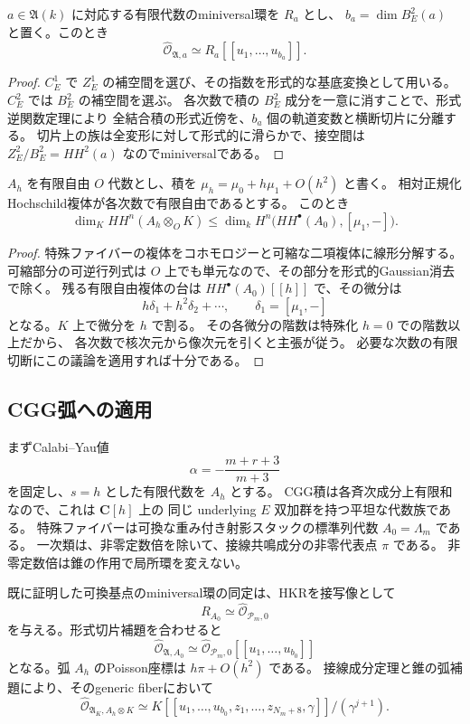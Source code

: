 \begin{lemma}[軌道方向を分離する形式切片]
\label{lem:algebra-slice-v35}
$a\in\mathfrak A(k)$ に対応する有限代数のminiversal環を $R_a$ とし、
$b_a=\dim B_E^2(a)$ と置く。このとき
\[
 \widehat{\mathcal O}_{\mathfrak A,a}
       \simeq R_a[[u_1,\ldots,u_{b_a}]].
\]
\end{lemma}

\begin{proof}
$C_E^1$ で $Z_E^1$ の補空間を選び、その指数を形式的な基底変換として用いる。
$C_E^2$ では $B_E^2$ の補空間を選ぶ。
各次数で積の $B_E^2$ 成分を一意に消すことで、形式逆関数定理により
全結合積の形式近傍を、$b_a$ 個の軌道変数と横断切片に分離する。
切片上の族は全変形に対して形式的に滑らかで、接空間は
$Z_E^2/B_E^2=HH^2(a)$ なのでminiversalである。
\end{proof}

\begin{lemma}[最初の差分による上界]
\label{lem:first-differential-v35}
$A_h$ を有限自由 $O$ 代数とし、積を
$\mu_h=\mu_0+h\mu_1+O(h^2)$ と書く。
相対正規化Hochschild複体が各次数で有限自由であるとする。
このとき
\[
 \dim_K HH^n(A_h\otimes_O K)
 \le
 \dim_k H^n\bigl(HH^\bullet(A_0),[\mu_1,-]\bigr).
\]
\end{lemma}

\begin{proof}
特殊ファイバーの複体をコホモロジーと可縮な二項複体に線形分解する。
可縮部分の可逆行列式は $O$ 上でも単元なので、その部分を形式的Gaussian消去で除く。
残る有限自由複体の台は $HH^\bullet(A_0)[[h]]$ で、その微分は
\[
 h\delta_1+h^2\delta_2+\cdots,\qquad
 \delta_1=[\mu_1,-]
\]
となる。$K$ 上で微分を $h$ で割る。
その各微分の階数は特殊化 $h=0$ での階数以上だから、
各次数で核次元から像次元を引くと主張が従う。
必要な次数の有限切断にこの議論を適用すれば十分である。
\end{proof}

\subsection{CGG弧への適用}

まずCalabi--Yau値
\[
 \alpha=-\frac{m+r+3}{m+3}
\]
を固定し、$s=h$ とした有限代数を $A_h$ とする。
CGG積は各斉次成分上有限和なので、これは $\mathbf C[h]$ 上の
同じ underlying $E$ 双加群を持つ平坦な代数族である。
特殊ファイバーは可換な重み付き射影スタックの標準列代数 $A_0=\Lambda_m$ である。
一次類は、非零定数倍を除いて、接線共鳴成分の非零代表点 $\pi$ である。
非零定数倍は錐の作用で局所環を変えない。

既に証明した可換基点のminiversal環の同定は、HKRを接写像として
\[
 R_{A_0}\simeq\widehat{\mathcal O}_{\mathscr P_m,0}
\]
を与える。形式切片補題を合わせると
\[
 \widehat{\mathcal O}_{\mathfrak A,A_0}
 \simeq
 \widehat{\mathcal O}_{\mathscr P_m,0}[[u_1,\ldots,u_{b_0}]]
\]
となる。弧 $A_h$ のPoisson座標は $h\pi+O(h^2)$ である。
接線成分定理と錐の弧補題により、そのgeneric fiberにおいて
\begin{equation}
\label{eq:generic-framed-local-v35}
 \widehat{\mathcal O}_{\mathfrak A_K,A_h\otimes K}
 \simeq
 K[[u_1,\ldots,u_{b_0},z_1,\ldots,z_{N_m+8},\gamma]]/
       (\gamma^{j+1}).
\end{equation}

